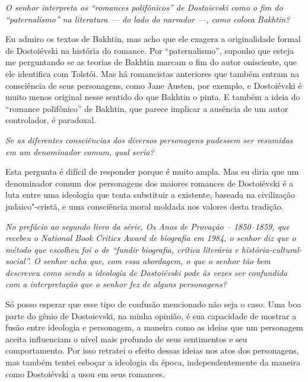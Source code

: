 \medskip

\emph{O senhor interpreta os ``romances polifônicos'' de Dostoievski como
o fim do ``paternalismo'' na literatura --- do lado do narrador ---,
como coloca Bakhtin?}

Eu admiro os textos de Bakhtin, mas acho que ele exagera a originalidade
formal de Dostoiévski na história do romance. Por ``paternalismo'',
suponho que esteja me perguntando se as teorias de Bakhtin marcam o fim
do autor onisciente, que ele identifica com Tolstói. Mas há romancistas
anteriores que também entram na consciência de seus personagens, como
Jane Austen, por exemplo, e Dostoiévski é muito menos original nesse
sentido do que Bakhtin o pinta. E também a ideia do ``romance polifônico''
de Bakhtin, que parece implicar a ausência de um autor controlador, é
paradoxal.

\medskip

\emph{Se as diferentes consciências dos diversos personagens pudessem ser
resumidas em um denominador comum, qual seria?}

Esta pergunta é difícil de responder porque é muito ampla. Mas eu diria
que um denominador comum dos personagens dos maiores romances de
Dostoiévski é a luta entre uma ideologia que tenta substituir a
existente, baseada na civilização judaico"-cristã, e uma consciência
moral moldada nos valores desta tradição.

\medskip

\emph{No prefácio ao segundo livro da série, \emph{Os Anos de Provação -- 1850--1859}, que recebeu o \emph{National Book Critics Award} de biografia em 1984, o
senhor diz que o método que escolheu foi o de ``fundir biografia, crítica
literária e história-cultural-social''. O senhor acha que, com essa
abordagem, o que o senhor tão bem descreveu como sendo a ideologia de
Dostoiévski pode às vezes ser confundida com a interpretação que o
senhor fez de alguns personagens?}

Só posso esperar que esse tipo de confusão mencionado não seja o caso.
Uma boa parte do gênio de Dostoievski, na minha opinião, é sua
capacidade de mostrar a fusão entre ideologia e personagem, a maneira
como as ideias que um personagem aceita influenciam o nível mais
profundo de seus sentimentos e seu comportamento. Por isso retratei o
efeito dessas ideias nos atos dos personagens, mas também tentei esboçar
a ideologia da época, independentemente da maneira como Dostoiévski a
usou em seus romances.

\medskip

